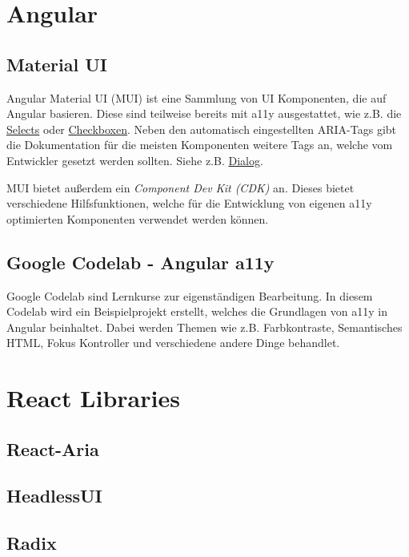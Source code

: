 \section{Angular}

\subsection{Material UI}

Angular Material UI (MUI) ist eine Sammlung von UI Komponenten, die auf Angular basieren. \cite{angular_components_team_angular_nodate} Diese sind teilweise bereits mit a11y ausgestattet, wie z.B. die \href{https://material.angular.io/components/select/overview#accessibility}{Selects} oder \href{https://material.angular.io/components/checkbox/overview#accessibility}{Checkboxen}. Neben den automatisch eingestellten ARIA-Tags gibt die Dokumentation für die meisten Komponenten weitere Tags an, welche vom Entwickler gesetzt werden sollten. Siehe z.B. \href{https://material.angular.io/components/dialog/overview#accessibility}{Dialog}.

MUI bietet außerdem ein \emph{Component Dev Kit (CDK)} an. Dieses bietet verschiedene Hilfsfunktionen, welche für die Entwicklung von eigenen a11y optimierten Komponenten verwendet werden können. \cite{angular_components_team_angular_nodate}

\subsection{Google Codelab - Angular a11y}

Google Codelab sind Lernkurse zur eigenständigen Bearbeitung. In diesem Codelab wird ein Beispielprojekt erstellt, welches die Grundlagen von a11y in Angular beinhaltet. Dabei werden Themen wie z.B. Farbkontraste, Semantisches HTML, Fokus Kontroller und verschiedene andere Dinge behandlet.

\section{React Libraries}

\subsection{React-Aria}

\subsection{HeadlessUI}

\subsection{Radix}
